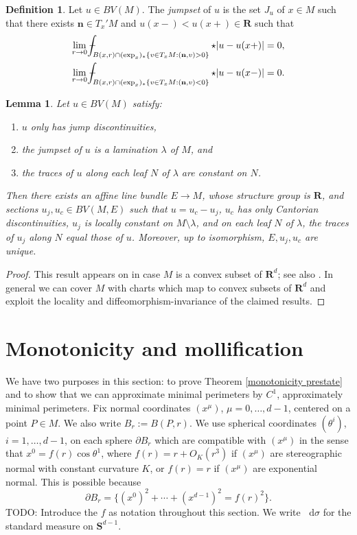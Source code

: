 \documentclass[reqno,10pt]{amsart}
\newcommand{\RR}{\mathbf{R}}
\newcommand{\Sph}{\mathbf S}
\newcommand*\dif{\mathop{}\!\mathrm{d}}
\newcommand{\normal}{\mathbf n}
\newcommand{\dfn}[1]{\emph{#1}\index{#1}}
\newtheorem{lemma}[theorem]{Lemma}
\theoremstyle{definition}
\newtheorem{definition}[theorem]{Definition}
\numberwithin{equation}{section}
\def\Xint#1{\mathchoice
{\XXint\displaystyle\textstyle{#1}}%
{\XXint\textstyle\scriptstyle{#1}}%
{\XXint\scriptstyle\scriptscriptstyle{#1}}%
{\XXint\scriptscriptstyle\scriptscriptstyle{#1}}%
\!\int}
\def\XXint#1#2#3{{\setbox0=\hbox{$#1{#2#3}{\int}$ }
\vcenter{\hbox{$#2#3$ }}\kern-.6\wd0}}
\def\dashint{\Xint-}
\begin{document}
\begin{definition}
Let $u \in BV(M)$. The \dfn{jumpset} of $u$ is the set $J_u$ of $x \in M$ such that there exists $\normal \in T_x'M$ and $u(x-) < u(x+) \in \RR$ such that 
\begin{align*}
\lim_{r \to 0} \dashint_{B(x, r) \cap (\exp_x)_* \{v \in T_xM: (\normal, v) > 0\}} \star |u - u(x+)|  & = 0, \\
\lim_{r \to 0} \dashint_{B(x, r) \cap (\exp_x)_* \{v \in T_xM: (\normal, v) < 0\}} \star |u - u(x-)|  & = 0.
\end{align*}
\end{definition}

\begin{lemma}\label{existence of jump graphs}
Let $u \in BV(M)$ satisfy:
\begin{enumerate}
\item $u$ only has jump discontinuities,
\item the jumpset of $u$ is a lamination $\lambda$ of $M$, and 
\item the traces of $u$ along each leaf $N$ of $\lambda$ are constant on $N$.
\end{enumerate}
Then there exists an affine line bundle $E \to M$, whose structure group is $\RR$, and sections $u_j, u_c \in BV(M, E)$ such that $u = u_c - u_j$, $u_c$ has only Cantorian discontinuities, $u_j$ is locally constant on $M \setminus \lambda$, and on each leaf $N$ of $\lambda$, the traces of $u_j$ along $N$ equal those of $u$.
Moreover, up to isomorphism, $E,u_j,u_c$ are unique.
\end{lemma}
\begin{proof}
This result appears on \cite[pp10--11]{górny2017planar} in case $M$ is a convex subset of $\RR^d$; see also \cite[Remark 3.15]{górny2017planar}.
In general we can cover $M$ with charts which map to convex subsets of $\RR^d$ and exploit the locality and diffeomorphism-invariance of the claimed results.
\end{proof}


\section{Monotonicity and mollification}\label{MollifierSection}
We have two purposes in this section: to prove Theorem \ref{monotonicity prestate} and to show that we can approximate minimal perimeters by $C^1$, approximately minimal perimeters.
Fix normal coordinates $(x^\mu)$, $\mu = 0, \dots, d - 1$, centered on a point $P \in M$.
We also write $B_r := B(P, r)$.
We use spherical coordinates $(\theta^i)$, $i = 1, \dots, d - 1$, on each sphere $\partial B_r$ which are compatible with $(x^\mu)$ in the sense that $x^0 = f(r) \cos \theta^1$, where $f(r) = r + O_K(r^3)$ if $(x^\mu)$ are stereographic normal with constant curvature $K$, or $f(r) = r$ if $(x^\mu)$ are exponential normal.
This is possible because
\begin{equation}\label{partial Br is a variety}
\partial B_r = \{(x^0)^2 + \cdots + (x^{d - 1})^2 = f(r)^2\}.
\end{equation}
TODO: Introduce the $f$ as notation throughout this section.
We write $\dif \sigma$ for the standard measure on $\Sph^{d - 1}$.
\end{document}

